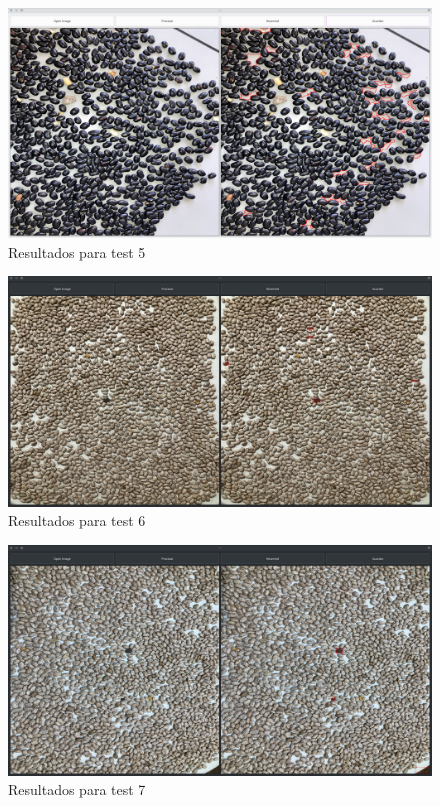 \documentclass[conference]{IEEEtran}
\begin{document}
        \begin{figure}[H]
            \centering
            \includegraphics[width=\breite\linewidth]{images/test5.png}
            \caption{Resultados para test 5}
            \label{fig:test5}
        \end{figure}

        \begin{figure}[H]
            \centering
            \includegraphics[width=\breite\linewidth]{images/test6.png}
            \caption{Resultados para test 6}
            \label{fig:test6}
        \end{figure}

        \begin{figure}[H]
            \centering
            \includegraphics[width=\breite\linewidth]{images/test7.png}
            \caption{Resultados para test 7}
            \label{fig:test7}
        \end{figure}
\end{document}
